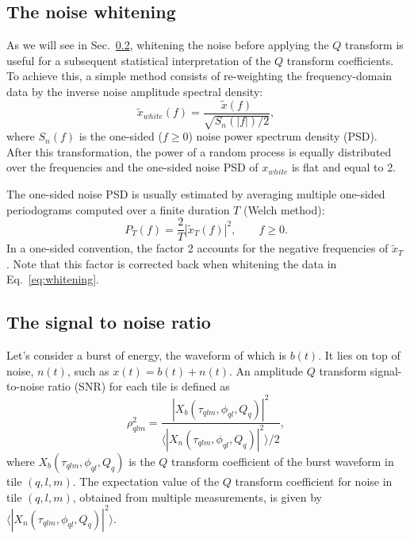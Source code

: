 \subsection{The noise whitening} \label{sec:method:whitening}

As we will see in Sec.~\ref{sec:method:snr}, whitening the noise before applying the $Q$ transform is useful for a subsequent statistical interpretation of the $Q$ transform coefficients. To achieve this, a simple method consists of re-weighting the frequency-domain data by the inverse noise amplitude spectral density:
\begin{equation}
  \tilde{x}_{white}(f) = \frac{\tilde{x}(f)}{\sqrt{S_n(|f|)/2}},
  \label{eq:whitening}
\end{equation}
where $S_n(f)$ is the one-sided ($f \ge 0$) noise power spectrum density (PSD). After this transformation, the power of a random process is equally distributed over the frequencies and the one-sided noise PSD of $x_{white}$ is flat and equal to 2.

The one-sided noise PSD is usually estimated by averaging multiple one-sided periodograms computed over a finite duration $T$ (Welch method):
\begin{equation}
  P_T(f) = \frac{2}{T}\left|\tilde{x}_T(f)\right|^2, \qquad f \ge 0.
  \label{eq:periodogram}
\end{equation}
In a one-sided convention, the factor 2 accounts for the negative frequencies of $\tilde{x}_T$. Note that this factor is corrected back when whitening the data in Eq.~\ref{eq:whitening}.


\subsection{The signal to noise ratio} \label{sec:method:snr}

Let's consider a burst of energy, the waveform of which is $b(t)$. It lies on top of noise, $n(t)$, such as $x(t) = b(t) + n(t)$. An amplitude $Q$ transform signal-to-noise ratio (SNR) for each tile is defined as
\begin{equation}
  \rho_{qlm}^2 =  \frac{|X_b(\tau_{qlm}, \phi_{ql}, Q_q)|^2}{\langle |X_n(\tau_{qlm}, \phi_{ql}, Q_q)|^2 \rangle/2}, \label{eq:snrdef}
\end{equation}
where $X_b(\tau_{qlm}, \phi_{ql}, Q_q)$ is the $Q$ transform coefficient of the burst waveform in tile $(q,l,m)$. The expectation value of the $Q$ transform coefficient for noise in tile $(q,l,m)$, obtained from multiple measurements, is given by $\langle |X_n(\tau_{qlm}, \phi_{ql}, Q_q)|^2\rangle$.

